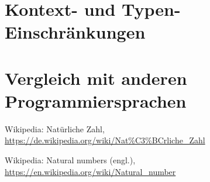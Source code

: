 \documentclass[10pt, a4paper, twocolumn]{article} %
\begin{document}
\section{Kontext- und Typen-Einschränkungen}

\section{Vergleich mit anderen Programmiersprachen}



\begin{thebibliography}{9}
	Wikipedia: Natürliche Zahl,
	\url{https://de.wikipedia.org/wiki/Nat\%C3\%BCrliche_Zahl}

    Wikipedia: Natural numbers (engl.),
    \url{https://en.wikipedia.org/wiki/Natural_number}


\end{thebibliography}
\end{document}
